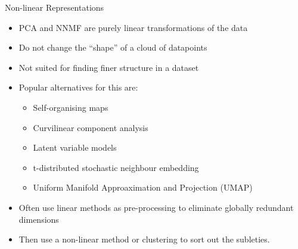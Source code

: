 \documentclass[aspectratio=169]{beamer}
\begin{document}
\begin{frame}{Non-linear Representations}
  \begin{itemize}
    \item PCA and NNMF are purely linear transformations of the data
    \item Do not change the ``shape'' of a cloud of datapoints
    \item Not suited for finding finer structure in a dataset
    \item Popular alternatives for this are:
    \begin{itemize}
      \item Self-organising maps
      \item Curvilinear component analysis
      \item Latent variable models
      \item t-distributed stochastic neighbour embedding
      \item Uniform Manifold Approaximation and Projection (UMAP)
    \end{itemize}
    \item Often use linear methods as pre-processing to eliminate globally redundant dimensions 
    \item Then use a non-linear method or clustering to sort out the subleties.
  \end{itemize}
\end{frame}
\end{document}
